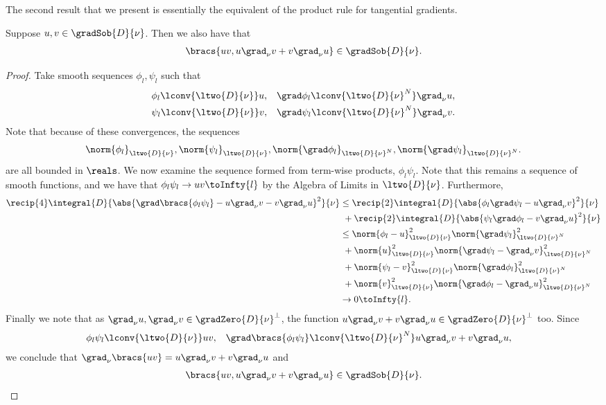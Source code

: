 The second result that we present is essentially the equivalent of the product rule for tangential gradients.
\begin{prop} \label{prop:ProductRuleGradients}
	Suppose $u,v\in\gradSob{D}{\nu}$.
	Then we also have that
	\begin{align*}
		\bracs{uv, u\grad_\nu v + v\grad_\nu u}\in\gradSob{D}{\nu}.
	\end{align*}
\end{prop}
\begin{proof}
	Take smooth sequences $\phi_l, \psi_l$ such that
	\begin{align*}
		\phi_l \lconv{\ltwo{D}{\nu}} u, &\quad \grad\phi_l \lconv{\ltwo{D}{\nu}^N} \grad_\nu u, \\
		\psi_l \lconv{\ltwo{D}{\nu}} v, &\quad \grad\psi_l \lconv{\ltwo{D}{\nu}^N} \grad_\nu v.
	\end{align*}
	Note that because of these convergences, the sequences 
	\begin{align*}
		\norm{\phi_l}_{\ltwo{D}{\nu}}, \norm{\psi_l}_{\ltwo{D}{\nu}}, \norm{\grad\phi_l}_{\ltwo{D}{\nu}^N}, \norm{\grad\psi_l}_{\ltwo{D}{\nu}^N}.
	\end{align*}
	are all bounded in $\reals$.
	We now examine the sequence formed from term-wise products, $\phi_l\psi_l$.
	Note that this remains a sequence of smooth functions, and we have that $\phi_l\psi_l \rightarrow uv \toInfty{l}$ by the Algebra of Limits in $\ltwo{D}{\nu}$.
	Furthermore,
	\begin{align*}
		\recip{4}\integral{D}{\abs{ \grad\bracs{\phi_l\psi_l} - u\grad_\nu v - v\grad_\nu u }^2}{\nu}
		&\leq \recip{2}\integral{D}{\abs{ \phi_l\grad\psi_l - u\grad_\nu v }^2}{\nu} \\
		& \ + \recip{2}\integral{D}{\abs{ \psi_l\grad\phi_l - v\grad_\nu u }^2}{\nu} \\
		&\leq \norm{\phi_l - u}_{\ltwo{D}{\nu}}^2\norm{\grad\psi_l}_{\ltwo{D}{\nu}^N}^2 \\
		& \ + \norm{u}_{\ltwo{D}{\nu}}^2\norm{\grad\psi_l - \grad_\nu v}_{\ltwo{D}{\nu}^N}^2 \\
		& \ + \norm{\psi_l - v}_{\ltwo{D}{\nu}}^2\norm{\grad\phi_l}_{\ltwo{D}{\nu}^N}^2 \\
		& \ + \norm{v}_{\ltwo{D}{\nu}}^2\norm{\grad\phi_l - \grad_\nu u}_{\ltwo{D}{\nu}^N}^2 \\
		&\rightarrow 0 \toInfty{l}.
	\end{align*}
	Finally we note that as $\grad_\nu u, \grad_\nu v \in\gradZero{D}{\nu}^\perp$, the function $u\grad_\nu v + v\grad_\nu u\in\gradZero{D}{\nu}^\perp$ too.
	Since
	\begin{align*}
		\phi_l\psi_l \lconv{\ltwo{D}{\nu}} uv, &\quad \grad\bracs{\phi_l\psi_l} \lconv{\ltwo{D}{\nu}^N} u\grad_\nu v + v\grad_\nu u,
	\end{align*}
	we conclude that $\grad_\nu\bracs{uv} = u\grad_\nu v + v\grad_\nu u$ and
	\begin{align*}
		\bracs{uv, u\grad_\nu v + v\grad_\nu u}\in\gradSob{D}{\nu}.
	\end{align*}
\end{proof}

